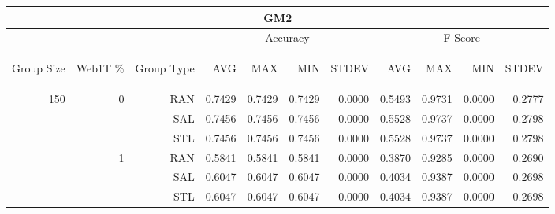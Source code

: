 \begin{center}
\begin{table}[htbp] 
 \begin{center}
\begin{tabular}{ | r | r | r | r | r | r | r | r | r | r | r |}
\hline
\multicolumn{11}{|c|}{GM2}\\
\hline
 & & & \multicolumn{4}{|c|}{Accuracy} & \multicolumn{4}{|c|}{F-Score}\\ \cline{4-11}
\begin{sideways}Group Size\end{sideways} & \begin{sideways}Web1T \%\end{sideways} & \begin{sideways}Group Type\end{sideways} & \begin{sideways}AVG\end{sideways} & \begin{sideways}MAX\end{sideways} & \begin{sideways}MIN\end{sideways} & \begin{sideways}STDEV\end{sideways} & \begin{sideways}AVG\end{sideways} & \begin{sideways}MAX\end{sideways} & \begin{sideways}MIN\end{sideways} & \begin{sideways}STDEV\end{sideways}\\
\hline
\multirow{12}{*}{150}
 & \multirow{3}{*}{0} & RAN & 0.7429 & 0.7429 & 0.7429 & 0.0000 & 0.5493 & 0.9731 & 0.0000 & 0.2777\\ \cline{3-11}
 &   & SAL & 0.7456 & 0.7456 & 0.7456 & 0.0000 & 0.5528 & 0.9737 & 0.0000 & 0.2798\\ \cline{3-11}
 &   & STL & 0.7456 & 0.7456 & 0.7456 & 0.0000 & 0.5528 & 0.9737 & 0.0000 & 0.2798\\ \cline{2-11}
 & \multirow{3}{*}{1} & RAN & 0.5841 & 0.5841 & 0.5841 & 0.0000 & 0.3870 & 0.9285 & 0.0000 & 0.2690\\ \cline{3-11}
 &   & SAL & 0.6047 & 0.6047 & 0.6047 & 0.0000 & 0.4034 & 0.9387 & 0.0000 & 0.2698\\ \cline{3-11}
 &   & STL & 0.6047 & 0.6047 & 0.6047 & 0.0000 & 0.4034 & 0.9387 & 0.0000 & 0.2698\\ \cline{2-11}

\end{tabular}
\end{center}
\end{table}
\end{center}
